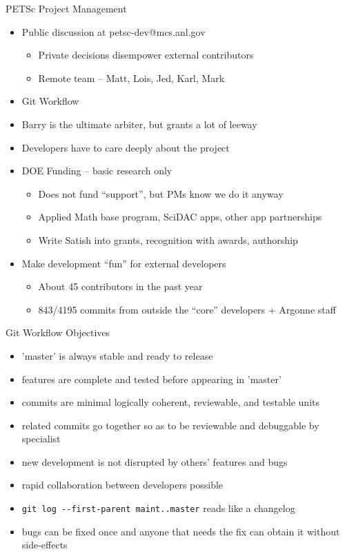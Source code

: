 \begin{frame}{PETSc Project Management}
  \begin{itemize}
  \item Public discussion at petsc-dev@mcs.anl.gov
    \begin{itemize}
    \item Private decisions disempower external contributors
    \item Remote team -- Matt, Lois, Jed, Karl, Mark
    \end{itemize}
  \item Git Workflow
  \item Barry is the ultimate arbiter, but grants a lot of leeway
  \item Developers have to care deeply about the project
  \item DOE Funding -- basic research only
    \begin{itemize}
    \item Does not fund ``support'', but PMs know we do it anyway
    \item Applied Math base program, SciDAC apps, other app partnerships
    \item Write Satish into grants, recognition with awards, authorship
    \end{itemize}
  \item Make development ``fun'' for external developers
    \begin{itemize}
    \item About 45 contributors in the past year
    \item 843/4195 commits from outside the ``core'' developers + Argonne staff
    \end{itemize}
  \end{itemize}
\end{frame}

\begin{frame}{Git Workflow Objectives}
  \begin{itemize}
  \item 'master' is always stable and ready to release
  \item features are complete and tested before appearing in 'master'
  \item commits are minimal logically coherent, reviewable, and testable units
  \item related commits go together so as to be reviewable and debuggable by specialist
  \item new development is not disrupted by others' features and bugs
  \item rapid collaboration between developers possible
  \item \texttt{git log -{}-first-parent maint..master} reads like a changelog
  \item bugs can be fixed once and anyone that needs the fix can obtain it without side-effects
  \end{itemize}
\end{frame}

